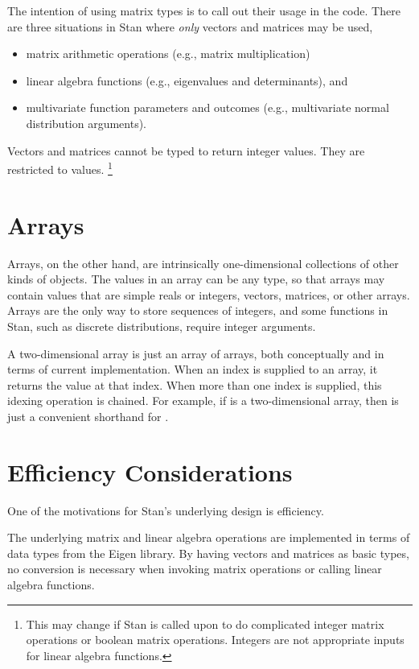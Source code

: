 The intention of using matrix types is to call out their usage in the
code.  There are three situations in Stan where {\it only} vectors and
matrices may be used,
%
\begin{itemize}
\item matrix arithmetic operations (e.g., matrix multiplication)
\item linear algebra functions (e.g., eigenvalues and determinants),
  and
\item multivariate function parameters and outcomes (e.g.,
  multivariate normal distribution arguments).
\end{itemize}
%

Vectors and matrices cannot be typed to return integer values.  They
are restricted to  values.%
%
\footnote{This may change if Stan is called upon to do complicated
  integer matrix operations or boolean matrix operations.  Integers
  are not appropriate inputs for linear algebra functions.}

\section{Arrays}

Arrays, on the other hand, are intrinsically one-dimensional
collections of other kinds of objects.  The values in an array can be
any type, so that arrays may contain values that are simple reals or
integers, vectors, matrices, or other arrays.  Arrays are the only way
to store sequences of integers, and some functions in Stan, such as
discrete distributions, require integer arguments. 


A two-dimensional array is just an array of arrays, both conceptually
and in terms of current implementation.  When an index is supplied to
an array, it returns the value at that index.  When more than one
index is supplied, this idexing operation is chained.  For example, if
 is a two-dimensional array, then  is just
a convenient shorthand for .


\section{Efficiency Considerations}

One of the motivations for Stan's underlying design is efficiency.

The underlying matrix and linear algebra operations are implemented in
terms of data types from the Eigen \Cpp library.  By having vectors
and matrices as basic types, no conversion is necessary when invoking
matrix operations or calling linear algebra functions.  

